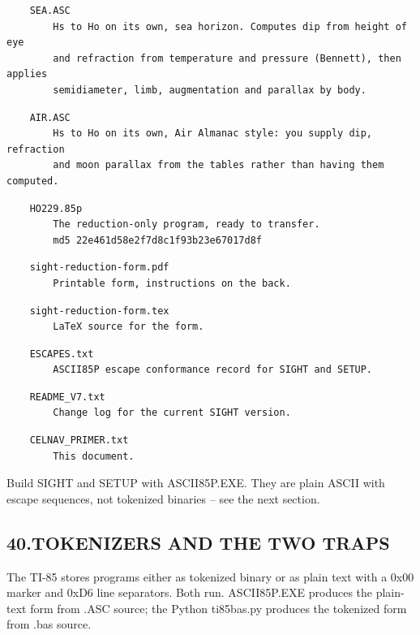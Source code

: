 \documentclass[11pt]{article}
\begin{document}
\begin{verbatim}
    SEA.ASC
        Hs to Ho on its own, sea horizon. Computes dip from height of eye
        and refraction from temperature and pressure (Bennett), then applies
        semidiameter, limb, augmentation and parallax by body.
\end{verbatim}

\begin{verbatim}
    AIR.ASC
        Hs to Ho on its own, Air Almanac style: you supply dip, refraction
        and moon parallax from the tables rather than having them computed.
\end{verbatim}

\begin{verbatim}
    HO229.85p
        The reduction-only program, ready to transfer.
        md5 22e461d58e2f7d8c1f93b23e67017d8f
\end{verbatim}

\begin{verbatim}
    sight-reduction-form.pdf
        Printable form, instructions on the back.
\end{verbatim}

\begin{verbatim}
    sight-reduction-form.tex
        LaTeX source for the form.
\end{verbatim}

\begin{verbatim}
    ESCAPES.txt
        ASCII85P escape conformance record for SIGHT and SETUP.
\end{verbatim}

\begin{verbatim}
    README_V7.txt
        Change log for the current SIGHT version.
\end{verbatim}

\begin{verbatim}
    CELNAV_PRIMER.txt
        This document.
\end{verbatim}

Build SIGHT and SETUP with ASCII85P.EXE. They are plain ASCII with escape sequences, not tokenized binaries -- see the next section.

\subsection*{40.\quad TOKENIZERS AND THE TWO TRAPS}

The TI-85 stores programs either as tokenized binary or as plain text with a 0x00 marker and 0xD6 line separators. Both run. ASCII85P.EXE produces the plain-text form from .ASC source; the Python ti85bas.py produces the tokenized form from .bas source.
\end{document}
